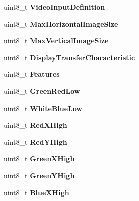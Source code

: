 \begin{DoxyCompactItemize}
uint8\+\_\+t {\bfseries Video\+Input\+Definition}
\item 
\mbox{\label{structRTEMS__PACKED_a331745ea1e51639e64004641f0a52585}} 
uint8\+\_\+t {\bfseries Max\+Horizontal\+Image\+Size}
\item 
\mbox{\label{structRTEMS__PACKED_a45e5aba34200d786a0ac40a7e907d605}} 
uint8\+\_\+t {\bfseries Max\+Vertical\+Image\+Size}
\item 
\mbox{\label{structRTEMS__PACKED_a765442f7cfac5a766501170d96000258}} 
uint8\+\_\+t {\bfseries Display\+Transfer\+Characteristic}
\item 
\mbox{\label{structRTEMS__PACKED_ad68c987b0b66adf1179144cc82a55dcd}} 
uint8\+\_\+t {\bfseries Features}
\item 
\mbox{\label{structRTEMS__PACKED_a26a4d8a14d95c38de92cecbdd32fdb19}} 
uint8\+\_\+t {\bfseries Green\+Red\+Low}
\item 
\mbox{\label{structRTEMS__PACKED_ad3ea882abc711063912f62d31b942db8}} 
uint8\+\_\+t {\bfseries White\+Blue\+Low}
\item 
\mbox{\label{structRTEMS__PACKED_ab740a5c4fddb2df1d26e4d4f1a7fd9ec}} 
uint8\+\_\+t {\bfseries Red\+X\+High}
\item 
\mbox{\label{structRTEMS__PACKED_a3c86159be271b087e68fae158706d5c7}} 
uint8\+\_\+t {\bfseries Red\+Y\+High}
\item 
\mbox{\label{structRTEMS__PACKED_a4e8f0dd3c0a26d58da6cc1ff4976f7ac}} 
uint8\+\_\+t {\bfseries Green\+X\+High}
\item 
\mbox{\label{structRTEMS__PACKED_ae71c525ecd9d1bf47a79398f4f274e89}} 
uint8\+\_\+t {\bfseries Green\+Y\+High}
\item 
\mbox{\label{structRTEMS__PACKED_ab9b5323983d2dea71194fde8b72e13d6}} 
uint8\+\_\+t {\bfseries Blue\+X\+High}
\item 
\mbox{\label{structRTEMS__PACKED_a6b24943c8fc35f32231254be864de75c}} 

\end{DoxyCompactItemize}
